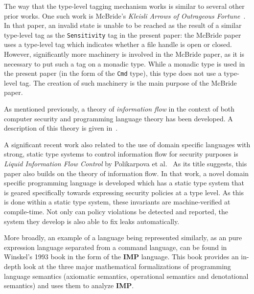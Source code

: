 \documentclass[10pt, conference]{IEEEtran}
\newcommand{\ttt}{\texttt}
\begin{document}
The way that the type-level tagging mechanism works is similar to several other
prior works. One such work is McBride's \textit{Kleisli Arrows of Outrageous
Fortune}~\cite{KleisliArrows}. In that paper, an invalid state is unable to be
reached as the result of a similar type-level tag as the \ttt{Sensitivity} tag
in the present paper: the McBride paper uses a type-level tag which indicates
whether a file handle is open or closed. However, significantly more machinery
is involved in the McBride paper, as it is necessary to put such a tag on a
monadic type. While a monadic type is used in the present paper (in the form of
the \ttt{Cmd} type), this type does not use a type-level tag. The creation of
such machinery is the main purpose of the McBride paper.

As mentioned previously, a theory of \textit{information flow} in the context of
both computer security and programming language theory has been developed. A description
of this theory is given in~\cite{InfoFlowAnalysis}.

A significant recent work also related to the use of domain specific languages
with strong, static type systems to control information flow for security
purposes is \textit{Liquid Information Flow Control} by Polikarpova et
al.~\cite{Lifty} As its title suggests, this paper also builds on the theory of information flow. In that work, a novel domain specific programming language is
developed which has a static type system that is geared specifically towards
expressing security policies at a type level. As this is done within a static
type system, these invariants are machine-verified at compile-time.  Not only
can policy violations be detected and reported, the system they develop is also able to
fix leaks automatically.

More broadly, an example of a language being represented similarly, as an
pure expression language separated from a command language, can be found in
Winskel's 1993 book in the form of the \textbf{IMP} language. This
book provides an in-depth look at the three major mathematical formalizations
of programming language semantics (axiomatic semantics, operational semantics and
denotational semantics) and uses them to analyze \textbf{IMP}.~\cite{WinskelBook}
\end{document}

